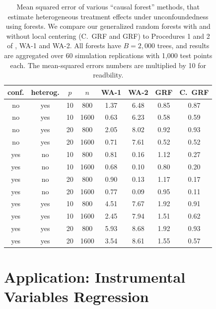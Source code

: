 \documentclass[aos]{imsart}
\theoremstyle{plain}
\theoremstyle{definition}
\theoremstyle{remark}
\begin{document}
\begin{CJK}{UTF8}{gbsn}
{\begin{table}[t]
\centering
\begin{tabular}{||cc|cc||cc|cc||}
\hline
conf. & heterog. & $p$ & $n$ & WA-1 & WA-2 & GRF & C.~GRF \\
  \hline
\hline
no & yes & 10 & 800 & 1.37 & 6.48 & 0.85 & 0.87 \\
  no & yes & 10 & 1600 & 0.63 & 6.23 & 0.58 & 0.59 \\
  no & yes & 20 & 800 & 2.05 & 8.02 & 0.92 & 0.93 \\
  no & yes & 20 & 1600 & 0.71 & 7.61 & 0.52 & 0.52 \\
   \hline
yes & no & 10 & 800 & 0.81 & 0.16 & 1.12 & 0.27 \\
  yes & no & 10 & 1600 & 0.68 & 0.10 & 0.80 & 0.20 \\
  yes & no & 20 & 800 & 0.90 & 0.13 & 1.17 & 0.17 \\
  yes & no & 20 & 1600 & 0.77 & 0.09 & 0.95 & 0.11 \\
   \hline
yes & yes & 10 & 800 & 4.51 & 7.67 & 1.92 & 0.91 \\
  yes & yes & 10 & 1600 & 2.45 & 7.94 & 1.51 & 0.62 \\
  yes & yes & 20 & 800 & 5.93 & 8.68 & 1.92 & 0.93 \\
  yes & yes & 20 & 1600 & 3.54 & 8.61 & 1.55 & 0.57 \\
   \hline
\end{tabular}
\caption{Mean squared error of various ``causal forest'' methods, that
estimate heterogeneous treatment effects under unconfoundedness using forests.
We compare our generalized random forests with and without local centering (C.~GRF and GRF)
to Procedures 1 and 2 of \citet{wager2015estimation}, WA-1 and WA-2.
All forests have $B=2,000$ trees, and results are aggregated over 60 simulation replications
with 1,000 test points each. The mean-squared errors numbers are multiplied by 10 for readbility.}
\label{tab:cf_simu}
\vspace{-1.5\baselineskip}
\end{table}


\section{Application: Instrumental Variables Regression}
\label{sec:iv}

}
\end{CJK}
\end{document}
